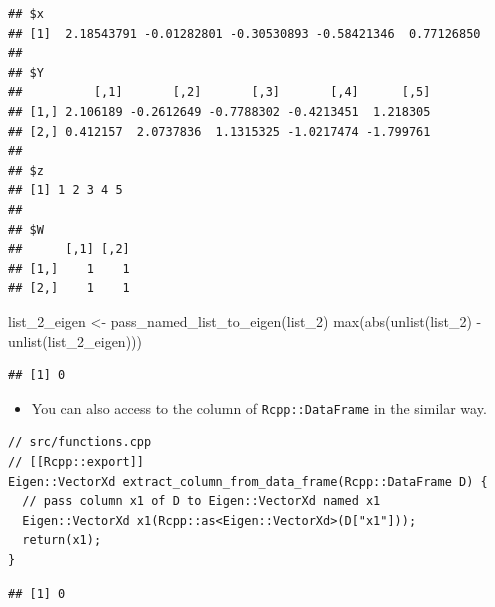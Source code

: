 \documentclass[
]{book}
\newenvironment{Shaded}{\begin{snugshade}}{\end{snugshade}}
\newcommand{\CommentTok}[1]{\textcolor[rgb]{0.56,0.35,0.01}{\textit{#1}}}
\newcommand{\FunctionTok}[1]{\textcolor[rgb]{0.00,0.00,0.00}{#1}}
\newcommand{\NormalTok}[1]{#1}
\newcommand{\OtherTok}[1]{\textcolor[rgb]{0.56,0.35,0.01}{#1}}
\newcommand{\SpecialCharTok}[1]{\textcolor[rgb]{0.00,0.00,0.00}{#1}}
\providecommand{\tightlist}{%
  \setlength{\itemsep}{0pt}\setlength{\parskip}{0pt}}
\begin{document}
\begin{verbatim}
## $x
## [1]  2.18543791 -0.01282801 -0.30530893 -0.58421346  0.77126850
## 
## $Y
##          [,1]       [,2]       [,3]       [,4]      [,5]
## [1,] 2.106189 -0.2612649 -0.7788302 -0.4213451  1.218305
## [2,] 0.412157  2.0737836  1.1315325 -1.0217474 -1.799761
## 
## $z
## [1] 1 2 3 4 5
## 
## $W
##      [,1] [,2]
## [1,]    1    1
## [2,]    1    1
\end{verbatim}

\begin{Shaded}
\begin{Highlighting}[]
\NormalTok{list\_2\_eigen }\OtherTok{\textless{}{-}} \FunctionTok{pass\_named\_list\_to\_eigen}\NormalTok{(list\_2)}
\FunctionTok{max}\NormalTok{(}\FunctionTok{abs}\NormalTok{(}\FunctionTok{unlist}\NormalTok{(list\_2) }\SpecialCharTok{{-}} \FunctionTok{unlist}\NormalTok{(list\_2\_eigen)))}
\end{Highlighting}
\end{Shaded}

\begin{verbatim}
## [1] 0
\end{verbatim}

\begin{itemize}
\tightlist
\item
  You can also access to the column of \texttt{Rcpp::DataFrame} in the similar way.
\end{itemize}

\begin{verbatim}
// src/functions.cpp
// [[Rcpp::export]]
Eigen::VectorXd extract_column_from_data_frame(Rcpp::DataFrame D) {
  // pass column x1 of D to Eigen::VectorXd named x1
  Eigen::VectorXd x1(Rcpp::as<Eigen::VectorXd>(D["x1"]));
  return(x1);
}
\end{verbatim}

\begin{Shaded}
\end{Shaded}

\begin{verbatim}
## [1] 0
\end{verbatim}
\end{document}
